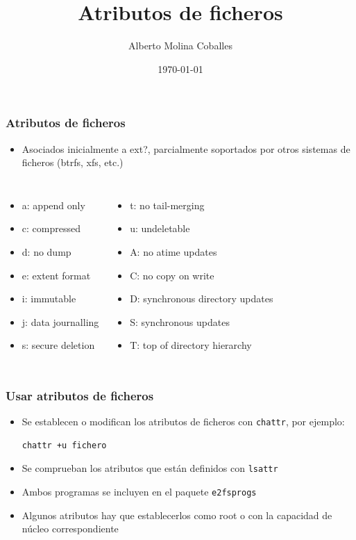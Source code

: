 \documentclass[aspectratio=169]{beamer}
\author{Alberto Molina Coballes}
\title{Atributos de ficheros}
\institute{IES Gonzalo Nazareno}
\date{\today}
\begin{document}
\def\braces#1{[#1]}

\begin{frame}[t,plain]
\titlepage
\end{frame}

\begin{frame}
  \frametitle{Atributos de ficheros}
  \begin{itemize}
  \item Asociados inicialmente a ext?, parcialmente soportados por otros sistemas de ficheros (btrfs, xfs, etc.)
  \end{itemize}
  \begin{columns}
    \begin{itemize}
    \item a: append only
    \item c: compressed
    \item d: no dump
    \item e: extent format
    \item i: immutable
    \item j: data journalling
    \item s: secure deletion
    \end{itemize}
    \begin{itemize}
    \item t: no tail-merging
    \item u: undeletable
    \item A: no atime updates
    \item C: no copy on write
    \item D: synchronous directory updates
    \item S: synchronous updates
    \item T: top of directory hierarchy
    \end{itemize}
  \end{columns}
\end{frame}

\begin{frame}[fragile]
  \frametitle{Usar atributos de ficheros}
  \begin{itemize}
  \item Se establecen o modifican los atributos de ficheros con \texttt{chattr}, por ejemplo:
    \begin{lstlisting}
chattr +u fichero
    \end{lstlisting}
  \item Se comprueban los atributos que están definidos con \texttt{lsattr}
  \item Ambos programas se incluyen en el paquete \texttt{e2fsprogs}
  \item Algunos atributos hay que establecerlos como root o con la capacidad de núcleo correspondiente
  \end{itemize}
\end{frame}
\end{document}
